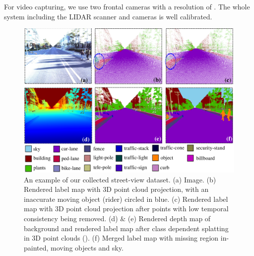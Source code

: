 For video capturing, we use two frontal cameras with a resolution of . The whole system including the LIDAR scanner and cameras is well calibrated.

\begin{figure}[t]
\begin{center}
\includegraphics[width=\linewidth]{fig/dataset.pdf}
\vspace{-1.7\baselineskip}
\end{center}
	\caption{An example of our collected street-view dataset. (a) Image. (b) Rendered label map with 3D point cloud projection, with an inaccurate moving object (rider) circled in blue. (c) Rendered label map with 3D point cloud projection after points with low temporal consistency being removed. (d) $\&$ (e) Rendered depth map of background and rendered label map after class dependent splatting in 3D point clouds (). (f) Merged label map with missing region in-painted, moving objects and sky.}
\label{fig:data}
\vspace{-1.3\baselineskip}
\end{figure}

